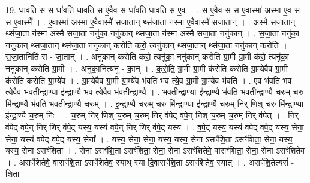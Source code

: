 \documentclass[17pt]{extarticle}
\begin{document}
19. धा॒व॒ति॒ स स धा॑वति धावति॒ स ए॒वैव स धा॑वति धावति॒ स ए॒व । . स ए॒वैव स स ए॒वास्मा॑ अस्मा ए॒व स स ए॒वास्मै᳚ । . ए॒वास्मा॑ अस्मा ए॒वैवास्मै॑ सजा॒तान् थ्स॑जा॒ता न॑स्मा ए॒वैवास्मै॑ सजा॒तान् । . अ॒स्मै॒ स॒जा॒तान् थ्स॑जा॒ता न॑स्मा अस्मै सजा॒ता ननु॑का॒ ननु॑कान् थ्सजा॒ता न॑स्मा अस्मै सजा॒ता ननु॑कान् । . स॒जा॒ता ननु॑का॒ ननु॑कान् थ्सजा॒तान् थ्स॑जा॒ता ननु॑कान् करोति करो॒ त्यनु॑कान् थ्सजा॒तान् थ्स॑जा॒ता ननु॑कान् करोति । . स॒जा॒तानिति॑ स - जा॒तान् । . अनु॑कान् करोति करो॒ त्यनु॑का॒ ननु॑कान् करोति ग्रा॒मी ग्रा॒मी क॑रो॒ त्यनु॑का॒ ननु॑कान् करोति ग्रा॒मी । . अनु॑का॒नित्यनु॑ - का॒न् । . क॒रो॒ति॒ ग्रा॒मी ग्रा॒मी क॑रोति करोति ग्रा॒म्ये॑वैव ग्रा॒मी क॑रोति करोति ग्रा॒म्ये॑व । . ग्रा॒म्ये॑वैव ग्रा॒मी ग्रा॒म्ये॑व भ॑वति भव त्ये॒व ग्रा॒मी ग्रा॒म्ये॑व भ॑वति । . ए॒व भ॑वति भव त्ये॒वैव भ॑वतीन्द्रा॒ण्या इ॑न्द्रा॒ण्यै भ॑व त्ये॒वैव भ॑वतीन्द्रा॒ण्यै । . भ॒व॒ती॒न्द्रा॒ण्या इ॑न्द्रा॒ण्यै भ॑वति भवतीन्द्रा॒ण्यै च॒रुम् च॒रु मि॑न्द्रा॒ण्यै भ॑वति भवतीन्द्रा॒ण्यै च॒रुम् । . इ॒न्द्रा॒ण्यै च॒रुम् च॒रु मि॑न्द्रा॒ण्या इ॑न्द्रा॒ण्यै च॒रुम् निर् णिश् च॒रु मि॑न्द्रा॒ण्या इ॑न्द्रा॒ण्यै च॒रुम् निः । . च॒रुम् निर् णिश् च॒रुम् च॒रुम् निर् व॑पेद् वपे॒न् निश् च॒रुम् च॒रुम् निर् व॑पेत् । . निर् व॑पेद् वपे॒न् निर् णिर् व॑पे॒द् यस्य॒ यस्य॑ वपे॒न् निर् णिर् व॑पे॒द् यस्य॑ । . व॒पे॒द् यस्य॒ यस्य॑ वपेद् वपे॒द् यस्य॒ सेना॒ सेना॒ यस्य॑ वपेद् वपे॒द् यस्य॒ सेना᳚ । . यस्य॒ सेना॒ सेना॒ यस्य॒ यस्य॒ सेना ऽसꣳ॑शि॒ता ऽसꣳ॑शिता॒ सेना॒ यस्य॒ यस्य॒ सेना ऽसꣳ॑शिता । . सेना ऽसꣳ॑शि॒ता ऽसꣳ॑शिता॒ सेना॒ सेना ऽसꣳ॑शितेवे॒ वासꣳ॑शिता॒ सेना॒ सेना ऽसꣳ॑शितेव । . असꣳ॑शितेवे॒ वासꣳ॑शि॒ता ऽसꣳ॑शितेव॒ स्याथ् स्या दि॒वासꣳ॑शि॒ता ऽसꣳ॑शितेव॒ स्यात् । . असꣳ॑शि॒तेत्यसं᳚ - शि॒ता॒ । \newline
\end{document}
